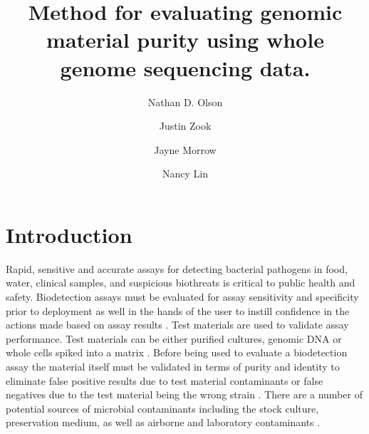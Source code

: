 \documentclass[fleqn,10pt,lineno]{wlpeerj}\usepackage[]{graphicx}\usepackage[]{color}
\title{Method for evaluating genomic material purity using whole genome sequencing data.}
\author[1]{Nathan D. Olson}
\author[1]{Justin Zook}
\author[1]{Jayne Morrow}
\author[1]{Nancy Lin}
\affil[1]{Biosystems and Biomaterials Division, National Institute of Standards and Technology}
\begin{document}
\flushbottom
\maketitle
\thispagestyle{empty}

\section*{Introduction}
Rapid, sensitive and accurate assays for detecting bacterial pathogens in food, water, clinical samples, and  suspicious biothreats is critical to public health and safety. 
Biodetection assays must be evaluated for assay sensitivity and specificity prior to deployment as well in the hands of the user to instill confidence in the actions made based on assay results \citep{Ieven2013,International2011,EPA2004,ISO/TS2010,Guide1998,Feldsine2002}. 
Test materials are used to validate assay performance.  Test materials can be either purified cultures, genomic DNA or whole cells spiked into a matrix \citep{EPA2004,ISO/TS2010,CLSI2010}. 
Before being used to evaluate a biodetection assay the material itself must be validated in terms of purity and identity to eliminate false positive results due to test material contaminants or false negatives due to the test material being the wrong strain \citep{CLSI2010}. 
There are a number of potential sources of microbial contaminants  including the stock culture, preservation medium, as well as airborne and laboratory contaminants \citep{Marron2013,Shrestha2013,Tanner1998}.   
 
\end{document}

